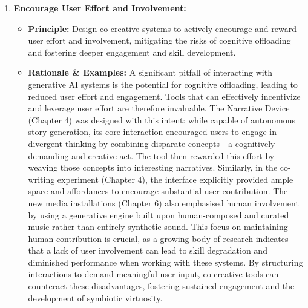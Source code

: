 \begin{enumerate}[label=\arabic*., wide, labelindent=0pt]
\item \textbf{Encourage User Effort and Involvement:}
    \begin{itemize}[label=\textbullet, leftmargin=*]
        \item \textbf{Principle:} Design co-creative systems to actively encourage and reward user effort and involvement, mitigating the risks of cognitive offloading and fostering deeper engagement and skill development.
        \item \textbf{Rationale \& Examples:} A significant pitfall of interacting with generative AI systems is the potential for cognitive offloading, leading to reduced user effort and engagement. Tools that can effectively incentivize and leverage user effort are therefore invaluable. The Narrative Device (Chapter 4) was designed with this intent: while capable of autonomous story generation, its core interaction encouraged users to engage in divergent thinking by combining disparate concepts—a cognitively demanding and creative act. The tool then rewarded this effort by weaving those concepts into interesting narratives. Similarly, in the co-writing experiment (Chapter 4), the interface explicitly provided ample space and affordances to encourage substantial user contribution. The new media installations (Chapter 6) also emphasised human involvement by using a generative engine built upon human-composed and curated music rather than entirely synthetic sound. This focus on maintaining human contribution is crucial, as a growing body of research indicates that a lack of user involvement can lead to skill degradation and diminished performance when working with these systems. By structuring interactions to demand meaningful user input, co-creative tools can counteract these disadvantages, fostering sustained engagement and the development of symbiotic virtuosity.
    \end{itemize}


\end{enumerate}

